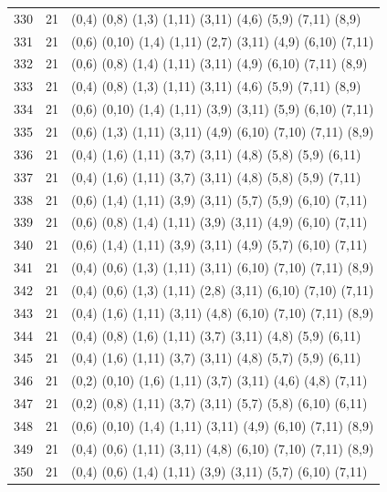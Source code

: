 \begin{appendix}
{\begin{longtable}{lll}
    330& 21 & (0,4)   (0,8)   (1,3)   (1,11)  (3,11)  (4,6)   (5,9)   (7,11)  (8,9)\\
    331& 21 & (0,6)   (0,10)  (1,4)   (1,11)  (2,7)   (3,11)  (4,9)   (6,10)  (7,11)\\
    332& 21 & (0,6)   (0,8)   (1,4)   (1,11)  (3,11)  (4,9)   (6,10)  (7,11)  (8,9)\\
    333& 21 & (0,4)   (0,8)   (1,3)   (1,11)  (3,11)  (4,6)   (5,9)   (7,11)  (8,9)\\
    334& 21 & (0,6)   (0,10)  (1,4)   (1,11)  (3,9)   (3,11)  (5,9)   (6,10)  (7,11)\\
    335& 21 & (0,6)   (1,3)   (1,11)  (3,11)  (4,9)   (6,10)  (7,10)  (7,11)  (8,9)\\
    336& 21 & (0,4)   (1,6)   (1,11)  (3,7)   (3,11)  (4,8)   (5,8)   (5,9)   (6,11)\\
    337& 21 & (0,4)   (1,6)   (1,11)  (3,7)   (3,11)  (4,8)   (5,8)   (5,9)   (7,11)\\
    338& 21 & (0,6)   (1,4)   (1,11)  (3,9)   (3,11)  (5,7)   (5,9)   (6,10)  (7,11)\\
    339& 21 & (0,6)   (0,8)   (1,4)   (1,11)  (3,9)   (3,11)  (4,9)   (6,10)  (7,11)\\
    340& 21 & (0,6)   (1,4)   (1,11)  (3,9)   (3,11)  (4,9)   (5,7)   (6,10)  (7,11)\\
    341& 21 & (0,4)   (0,6)   (1,3)   (1,11)  (3,11)  (6,10)  (7,10)  (7,11)  (8,9)\\
    342& 21 & (0,4)   (0,6)   (1,3)   (1,11)  (2,8)   (3,11)  (6,10)  (7,10)  (7,11)\\
    343& 21 & (0,4)   (1,6)   (1,11)  (3,11)  (4,8)   (6,10)  (7,10)  (7,11)  (8,9)\\
    344& 21 & (0,4)   (0,8)   (1,6)   (1,11)  (3,7)   (3,11)  (4,8)   (5,9)   (6,11)\\
    345& 21 & (0,4)   (1,6)   (1,11)  (3,7)   (3,11)  (4,8)   (5,7)   (5,9)   (6,11)\\
    346& 21 & (0,2)   (0,10)  (1,6)   (1,11)  (3,7)   (3,11)  (4,6)   (4,8)   (7,11)\\
    347& 21 & (0,2)   (0,8)   (1,11)  (3,7)   (3,11)  (5,7)   (5,8)   (6,10)  (6,11)\\
    348& 21 & (0,6)   (0,10)  (1,4)   (1,11)  (3,11)  (4,9)   (6,10)  (7,11)  (8,9)\\
    349& 21 & (0,4)   (0,6)   (1,11)  (3,11)  (4,8)   (6,10)  (7,10)  (7,11)  (8,9)\\
    350& 21 & (0,4)   (0,6)   (1,4)   (1,11)  (3,9)   (3,11)  (5,7)   (6,10)  (7,11)\\

\end{longtable}}
\end{appendix}
